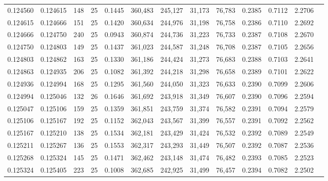 \begin{tabular}{rrrrrrrrrrrrr}
0.124560 & 0.124615 &   148 &  25 &                                     0.1445 & 360,483 & 245,127 &  31,173 &  76,783 & 0.2385 & 0.7112 & 2.2706 \\
0.124615 & 0.124666 &   151 &  25 &                                     0.1420 & 360,634 & 244,976 &  31,198 &  76,758 & 0.2386 & 0.7110 & 2.2692 \\
0.124666 & 0.124750 &   240 &  25 &                                     0.0943 & 360,874 & 244,736 &  31,223 &  76,733 & 0.2387 & 0.7108 & 2.2670 \\
0.124750 & 0.124803 &   149 &  25 &                                     0.1437 & 361,023 & 244,587 &  31,248 &  76,708 & 0.2387 & 0.7105 & 2.2656 \\
0.124803 & 0.124862 &   163 &  25 &                                     0.1330 & 361,186 & 244,424 &  31,273 &  76,683 & 0.2388 & 0.7103 & 2.2641 \\
0.124863 & 0.124935 &   206 &  25 &                                     0.1082 & 361,392 & 244,218 &  31,298 &  76,658 & 0.2389 & 0.7101 & 2.2622 \\
0.124936 & 0.124994 &   168 &  25 &                                     0.1295 & 361,560 & 244,050 &  31,323 &  76,633 & 0.2390 & 0.7099 & 2.2606 \\
0.124994 & 0.125046 &   132 &  26 &                                     0.1646 & 361,692 & 243,918 &  31,349 &  76,607 & 0.2390 & 0.7096 & 2.2594 \\
0.125047 & 0.125106 &   159 &  25 &                                     0.1359 & 361,851 & 243,759 &  31,374 &  76,582 & 0.2391 & 0.7094 & 2.2579 \\
0.125106 & 0.125167 &   192 &  25 &                                     0.1152 & 362,043 & 243,567 &  31,399 &  76,557 & 0.2391 & 0.7092 & 2.2562 \\
0.125167 & 0.125210 &   138 &  25 &                                     0.1534 & 362,181 & 243,429 &  31,424 &  76,532 & 0.2392 & 0.7089 & 2.2549 \\
0.125211 & 0.125267 &   136 &  25 &                                     0.1553 & 362,317 & 243,293 &  31,449 &  76,507 & 0.2392 & 0.7087 & 2.2536 \\
0.125268 & 0.125324 &   145 &  25 &                                     0.1471 & 362,462 & 243,148 &  31,474 &  76,482 & 0.2393 & 0.7085 & 2.2523 \\
0.125324 & 0.125405 &   223 &  25 &                                     0.1008 & 362,685 & 242,925 &  31,499 &  76,457 & 0.2394 & 0.7082 & 2.2502 \\

\end{tabular}
